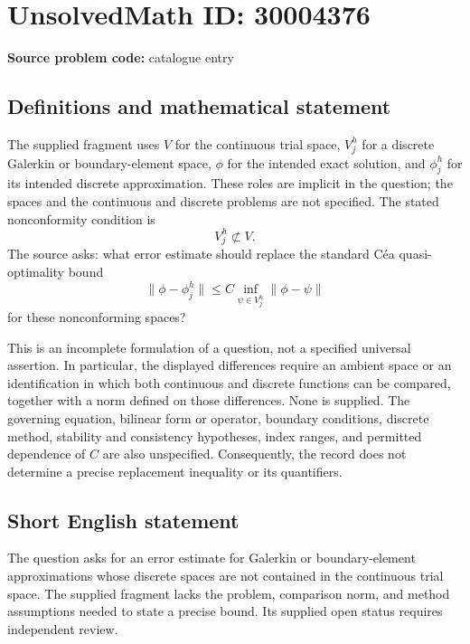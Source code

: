 \documentclass[11pt]{article}
\begin{document}
\section*{UnsolvedMath ID: 30004376}
\textbf{Source problem code:} catalogue entry
\subsection{Definitions and mathematical statement}
The supplied fragment uses \(V\) for the continuous trial space, \(V_j^h\) for a discrete Galerkin or boundary-element space, \(\phi\) for the intended exact solution, and \(\phi_j^h\) for its intended discrete approximation. These roles are implicit in the question; the spaces and the continuous and discrete problems are not specified. The stated nonconformity condition is
\[
V_j^h\not\subset V.
\]
The source asks: what error estimate should replace the standard C\'ea quasi-optimality bound
\[
\|\phi-\phi_j^h\|
\leq C\inf_{\psi\in V_j^h}\|\phi-\psi\|
\]
for these nonconforming spaces?

This is an incomplete formulation of a question, not a specified universal assertion. In particular, the displayed differences require an ambient space or an identification in which both continuous and discrete functions can be compared, together with a norm defined on those differences. None is supplied. The governing equation, bilinear form or operator, boundary conditions, discrete method, stability and consistency hypotheses, index ranges, and permitted dependence of \(C\) are also unspecified. Consequently, the record does not determine a precise replacement inequality or its quantifiers.
\subsection{Short English statement}
The question asks for an error estimate for Galerkin or boundary-element approximations whose discrete spaces are not contained in the continuous trial space. The supplied fragment lacks the problem, comparison norm, and method assumptions needed to state a precise bound. Its supplied open status requires independent review.
\end{document}
